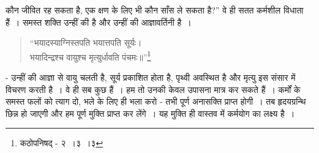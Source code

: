 कौन जीवित रह सकता है, एक क्षण के लिए भी कौन साँस ले सकता है?” वे ही सतत कर्मशील विधाता हैं~। समस्त शक्ति उन्हीं की है और उन्हीं की आज्ञावर्तिनी है~।

\begin{verse}
“भयादस्याग्निस्तपति भयात्तपति सूर्यः।\\ भयादिन्द्रश्च वायुश्च मृत्युर्धावति पंचमः॥”\footnote{कठोपनिषद् - २~।३~।३}
\end{verse}

\noindent- उन्हीं की आज्ञा से वायु चलती है, सूर्य प्रकाशित होता है, पृथ्वी अवस्थित है और मृत्यु इस संसार में विचरण करती है~। वे ही सब कुछ हैं~। हम तो उनकी केवल उपासना मात्र कर सकते हैं~। कर्मों के समस्त फलों को त्याग दो, भले के लिए ही भला करो - तभी पूर्ण अनासक्ति प्राप्त होगी~। तब हृदयग्रन्थि छिन्न हो जाएगी और हम पूर्ण मुक्ति प्राप्त कर लेंगे~। यह मुक्ति ही वास्तव में कर्मयोग का लक्ष्य है~।

